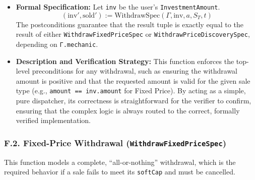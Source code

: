 \documentclass[
  english,
  onecolumn]{article}
\providecommand{\tightlist}{%
  \setlength{\itemsep}{0pt}\setlength{\parskip}{0pt}}
\begin{document}
\begin{itemize}
\tightlist
\item
  \textbf{Formal Specification:} Let \texttt{inv} be the user's
  \texttt{InvestmentAmount}. \[
  (\text{inv}', \text{sold}') := \text{WithdrawSpec}(\Gamma, \text{inv}, a, S_T, t)
  \] The postconditions guarantee that the result tuple is exactly equal
  to the result of either \texttt{WithdrawFixedPriceSpec} or
  \texttt{WithdrawPriceDiscoverySpec}, depending on \texttt{Γ.mechanic}.
\item
  \textbf{Description and Verification Strategy:} This function enforces
  the top-level preconditions for any withdrawal, such as ensuring the
  withdrawal amount is positive and that the requested amount is valid
  for the given sale type (e.g., \texttt{amount\ ==\ inv.amount} for
  Fixed Price). By acting as a simple, pure dispatcher, its correctness
  is straightforward for the verifier to confirm, ensuring that the
  complex logic is always routed to the correct, formally verified
  implementation.
\end{itemize}

\subsubsection{\texorpdfstring{F.2. Fixed-Price Withdrawal
(\texttt{WithdrawFixedPriceSpec})}{F.2. Fixed-Price Withdrawal (WithdrawFixedPriceSpec)}}\label{f.2.-fixed-price-withdrawal-withdrawfixedpricespec}

This function models a complete, ``all-or-nothing'' withdrawal, which is
the required behavior if a sale fails to meet its \texttt{softCap} and
must be cancelled.
\end{document}
